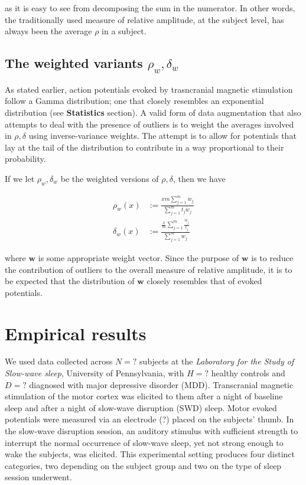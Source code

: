 \documentclass{article}
\begin{document}
as it is easy to see from decomposing the sum in the numerator. In other words, the traditionally used measure of relative amplitude, at the subject level, has always been the average $\rho$ in a subject. 

\subsection{The weighted variants $\rho_w, \delta_w$}

As stated earlier, action potentials evoked by trasncranial magnetic stimulation follow a Gamma distribution; one that closely resembles an exponential distribution (see \textbf{Statistics} section). A valid form of data augmentation that also attempts to deal with the presence of outliers is to weight the averages involved in $\rho, \delta$ using inverse-variance weights. The attempt is to allow for potentials that lay at the tail of the distribution to contribute in a way proportional to their probability. 

If we let $\rho_w, \delta_w$ be the weighted versions of $\rho, \delta$, then we have 

\begin{align}
    \rho_w(x) &:= \frac{xm\sum_{j=1}^m w_j}{\sum_{j=1}^m t_j w_j} \\
    \delta_w(x) &:= \frac{\frac{x}{m}\sum_{j=1}^m\frac{w_j}{t_j}}{\sum_{j=1}^m w_j}
\end{align}

where $\textbf{w}$ is some appropriate weight vector. Since the purpose of $\textbf{w}$ is to reduce the contribution of outliers to the overall measure of relative amplitude, it is to be expected that the distribution of $\textbf{w}$ closely resembles that of evoked potentials.

\section{Empirical results}

We used data collected across $N = ?$ subjects at the \textit{Laboratory for the Study of Slow-wave sleep}, University of Pennsylvania, with $H = ?$ healthy controls and $D = ?$ diagnosed with major depressive disorder (MDD). Transcranial magnetic stimulation of the motor cortex was elicited to them after a night of baseline sleep and after a night of slow-wave disruption (SWD) sleep. Motor evoked potentials were measured via an electrode (?) placed on the subjects' thumb. In the slow-wave disruption session, an auditory stimulus with sufficient strength to interrupt the normal occurrence of slow-wave sleep, yet not strong enough to wake the subjects, was elicited. This experimental setting produces four distinct categories, two depending on the subject group and two on the type of sleep session underwent.
\end{document}
